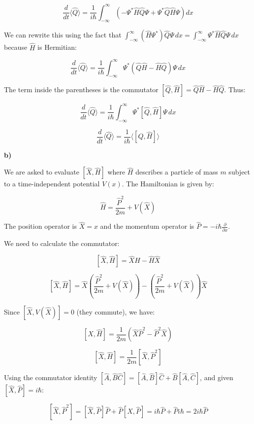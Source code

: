 \documentclass{article}
\begin{document}
\[
\frac{d}{dt} \langle \hat{Q} \rangle = \frac{1}{i\hbar} \int_{-\infty}^{\infty} \left( -\Psi^* \hat{H} \hat{Q} \Psi + \Psi^* \hat{Q} \hat{H} \Psi \right) dx
\]

We can rewrite this using the fact that $\int_{-\infty}^{\infty} (\hat{H} \Psi^*) \hat{Q} \Psi \, dx = \int_{-\infty}^{\infty} \Psi^* \hat{H} \hat{Q} \Psi \, dx$ because $\hat{H}$ is Hermitian:

\[
\frac{d}{dt} \langle \hat{Q} \rangle = \frac{1}{i\hbar} \int_{-\infty}^{\infty} \Psi^* (\hat{Q} \hat{H} - \hat{H} \hat{Q}) \Psi \, dx
\]

The term inside the parentheses is the commutator $[\hat{Q}, \hat{H}] = \hat{Q} \hat{H} - \hat{H} \hat{Q}$. Thus:

\[
\frac{d}{dt} \langle \hat{Q} \rangle = \frac{1}{i\hbar} \int_{-\infty}^{\infty} \Psi^* [\hat{Q}, \hat{H}] \Psi \, dx
\]

\[
\frac{d}{dt} \langle \hat{Q} \rangle = \frac{1}{i\hbar} \langle [\hat{Q}, \hat{H}] \rangle
\]

\textbf{b)}

We are asked to evaluate $[\hat{X}, \hat{H}]$ where $\hat{H}$ describes a particle of mass $m$ subject to a time-independent potential $V(x)$. The Hamiltonian is given by:

\[
\hat{H} = \frac{\hat{P}^2}{2m} + V(\hat{X})
\]

The position operator is $\hat{X} = x$ and the momentum operator is $\hat{P} = -i\hbar \frac{\partial}{\partial x}$.

We need to calculate the commutator:

\[
[\hat{X}, \hat{H}] = \hat{X}\hat{H} - \hat{H}\hat{X}
\]

\[
[\hat{X}, \hat{H}] = \hat{X} \left( \frac{\hat{P}^2}{2m} + V(\hat{X}) \right) - \left( \frac{\hat{P}^2}{2m} + V(\hat{X}) \right) \hat{X}
\]

Since $[\hat{X}, V(\hat{X})] = 0$ (they commute), we have:

\[
[\hat{X}, \hat{H}] = \frac{1}{2m} (\hat{X}\hat{P}^2 - \hat{P}^2\hat{X})
\]

\[
[\hat{X}, \hat{H}] = \frac{1}{2m} [\hat{X}, \hat{P}^2]
\]

Using the commutator identity $[\hat{A}, \hat{B}\hat{C}] = [\hat{A}, \hat{B}]\hat{C} + \hat{B}[\hat{A}, \hat{C}]$, and given $[\hat{X}, \hat{P}] = i\hbar$:

\[
[\hat{X}, \hat{P}^2] = [\hat{X}, \hat{P}]\hat{P} + \hat{P}[\hat{X}, \hat{P}] = i\hbar \hat{P} + \hat{P} i\hbar = 2i\hbar \hat{P}
\]
\end{document}
